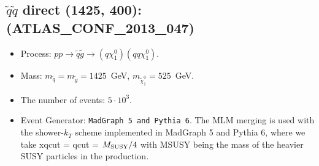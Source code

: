 \documentclass[12pt]{article}
\begin{document}
    
\subsection*{$\tilde q \tilde q$ direct (1425, 400): (ATLAS\_CONF\_2013\_047)} 


        \begin{itemize}
        \item  Process: $pp \to \tilde q \tilde g \to (q \chi_1^0)(q q \chi_1^0)$.
        \item  Mass: $m_{\tilde q} = m_{\tilde g} = 1425$~GeV, $m_{\tilde \chi_1^0} = 525$~GeV.
        \item  The number of events: $5 \cdot 10^3$.
        \item  Event Generator: {\tt MadGraph 5 and Pythia 6}.
                The MLM merging is used with the shower-$k_T$ scheme implemented in MadGraph 5 and Pythia 6, where we take xqcut = qcut = $M_{\rm SUSY}/4$ with MSUSY being the mass of the heavier SUSY particles in the production.      
        \end{itemize}    
    
\end{document}
